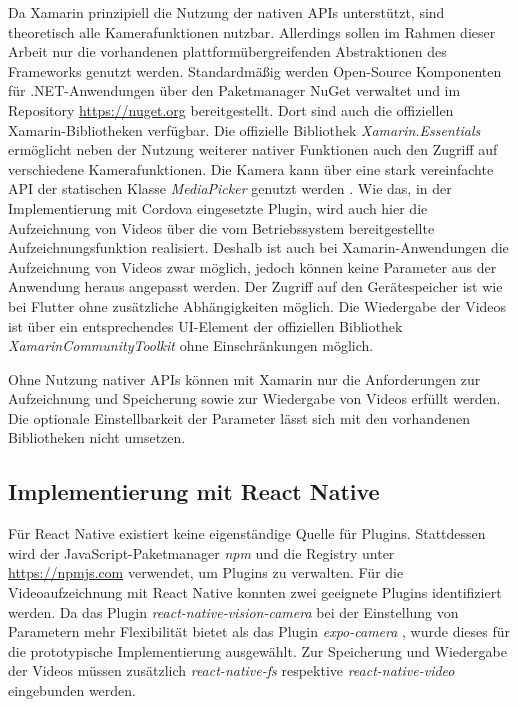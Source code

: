 Da Xamarin prinzipiell die Nutzung der nativen \acp{API} unterstützt, sind theoretisch alle Kamerafunktionen nutzbar.
Allerdings sollen im Rahmen dieser Arbeit nur die vorhandenen plattformübergreifenden Abstraktionen des Frameworks genutzt werden.
Standardmäßig werden Open-Source Komponenten für .NET-Anwendungen über den Paketmanager NuGet verwaltet und im Repository \url{https://nuget.org} bereitgestellt.
Dort sind auch die offiziellen Xamarin-Bibliotheken verfügbar.
Die offizielle Bibliothek \textit{Xamarin.Essentials} ermöglicht neben der Nutzung weiterer nativer Funktionen auch den Zugriff auf verschiedene Kamerafunktionen.
Die Kamera kann über eine stark vereinfachte \ac{API} der statischen Klasse \textit{MediaPicker} genutzt werden \cite{Xamarin_MediaPicker}.
Wie das, in der Implementierung mit Cordova eingesetzte Plugin, wird auch hier die Aufzeichnung von Videos über die vom Betriebssystem bereitgestellte Aufzeichnungsfunktion realisiert.
Deshalb ist auch bei Xamarin-Anwendungen die Aufzeichnung von Videos zwar möglich, jedoch können keine Parameter aus der Anwendung heraus angepasst werden.
Der Zugriff auf den Gerätespeicher ist wie bei Flutter ohne zusätzliche Abhängigkeiten möglich.
Die Wiedergabe der Videos ist über ein entsprechendes \ac{UI}-Element der offiziellen Bibliothek \textit{XamarinCommunityToolkit} \cite{Xamarin_CommunityToolkit} ohne Einschränkungen möglich.

Ohne Nutzung nativer \acp{API} können mit Xamarin nur die Anforderungen zur Aufzeichnung und Speicherung sowie zur Wiedergabe von Videos erfüllt werden.
Die optionale Einstellbarkeit der Parameter lässt sich mit den vorhandenen Bibliotheken nicht umsetzen.


\subsection{Implementierung mit React Native}
\label{sec:evaluation_reactnative}

Für React Native existiert keine eigenständige Quelle für Plugins.
Stattdessen wird der JavaScript-Paketmanager \textit{npm} und die Registry unter \url{https://npmjs.com} verwendet, um Plugins zu verwalten.
Für die Videoaufzeichnung mit React Native konnten zwei geeignete Plugins identifiziert werden.
Da das Plugin \textit{react-native-vision-camera} \cite{Vision_Camera} bei der Einstellung von Parametern mehr Flexibilität bietet als das Plugin \textit{expo-camera} \cite{Expo_Camera}, wurde dieses für die prototypische Implementierung ausgewählt.
Zur Speicherung und Wiedergabe der Videos müssen zusätzlich \textit{react-native-fs} \cite{ReactNative_FileSystem} respektive \textit{react-native-video} \cite{ReactNative_Video} eingebunden werden.

